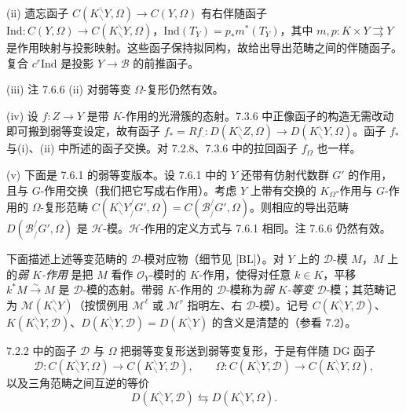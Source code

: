 (ii) 遗忘函子 $C(K^{\backslash}_{\backslash}Y,\Omega)\to C(Y,\Omega)$ 有右伴随函子 $\mathrm{Ind}:C(Y,\Omega)\to C(K^{\backslash}_{\backslash}Y,\Omega)$，$\mathrm{Ind}(T^{\cdot}_{Y})=p_{*}m^{*}(T^{\cdot}_{Y})$，其中 $m,p:K\times Y\rightrightarrows Y$ 是作用映射与投影映射。这些函子保持拟同构，故给出导出范畴之间的伴随函子。复合 $c^{r}\mathrm{Ind}$ 是投影 $Y\to\mathcal{B}$ 的前推函子。

(iii) 注 7.6.6 (ii) 对弱等变 $\Omega$-复形仍然有效。


(iv) 设 $f:Z\to Y$ 是带 $K$-作用的光滑簇的态射。7.3.6 中正像函子的构造无需改动即可搬到弱等变设定，故有函子 $f_{*}=Rf_{\cdot}:D(K^{\backslash}_{\backslash}Z,\Omega)\to D(K^{\backslash}_{\backslash}Y,\Omega)$。函子 $f_{*}$ 与(i)、(ii) 中所述的函子交换。对 7.2.8、7.3.6 中的拉回函子 $f^{\cdot}_{\Omega}$ 也一样。

(v) 下面是 7.6.1 的弱等变版本。设 7.6.1 中的 $Y$ 还带有仿射代数群 $G'$ 的作用，且与 $G$-作用交换（我们把它写成右作用）。考虑 $Y$ 上带有交换的 $K_{\Omega}$-作用与 $G$-作用的 $\Omega$-复形范畴 $C(K^{\backslash}_{\backslash}Y_{/}^{/}G',\Omega)=C(\mathcal{B}_{/}^{/}G',\Omega)$。则相应的导出范畴 $D(\mathcal{B}_{/}^{/}G',\Omega)$ 是 $\mathcal{H}$-模。$\mathcal{H}$-作用的定义方式与 7.6.1 相同。注 7.6.6 仍然有效。


 下面描述上述等变范畴的 $\mathcal{D}$-模对应物（细节见 [BL]）。对 $Y$ 上的 $\mathcal{D}$-模 $M$，$M$ 上的\emph{弱 $K$-作用} 是把 $M$ 看作 $\mathcal{O}_{Y}$-模时的 $K$-作用，使得对任意 $k\in K$，平移 $k^{*}M\xrightarrow{\sim}M$ 是 $\mathcal{D}$-模的态射。带弱 $K$-作用的 $\mathcal{D}$-模称为\emph{弱 $K$-等变} $\mathcal{D}$-模；其范畴记为 $\mathcal{M}(K^{\backslash}_{\backslash}Y)$（按惯例用 $\mathcal{M}^{\ell}$ 或 $\mathcal{M}^{r}$ 指明左、右 $\mathcal{D}$-模）。记号 $C(K^{\backslash}_{\backslash}Y,\mathcal{D})$、$K(K^{\backslash}_{\backslash}Y,\mathcal{D})$、$D(K^{\backslash}_{\backslash}Y,\mathcal{D})=D(K^{\backslash}_{\backslash}Y)$ 的含义是清楚的（参看 7.2）。

7.2.2 中的函子 $\mathcal{D}$ 与 $\Omega$ 把弱等变复形送到弱等变复形，于是有伴随 DG 函子
\begin{equation}\tag{320}
\mathcal{D}:C(K^{\backslash}_{\backslash}Y,\Omega)\to C(K^{\backslash}_{\backslash}Y,\mathcal{D}),\qquad
\Omega:C(K^{\backslash}_{\backslash}Y,\mathcal{D})\to C(K^{\backslash}_{\backslash}Y,\Omega),
\end{equation}
以及三角范畴之间互逆的等价
\begin{equation}\tag{321}
D(K^{\backslash}_{\backslash}Y,\mathcal{D})\leftrightarrows D(K^{\backslash}_{\backslash}Y,\Omega).
\end{equation}

